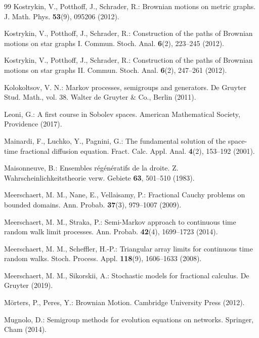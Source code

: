 \documentclass[11pt,a4paper]{article}
\theoremstyle{plain}
\theoremstyle{definition}
\theoremstyle{remark}
\begin{document}
\begin{thebibliography}{99}
			Kostrykin, V., Potthoff, J., Schrader, R.:
			Brownian motions on metric graphs. J. Math. Phys. \textbf{53}(9), 095206 (2012).
			
			Kostrykin, V., Potthoff, J., Schrader, R.:
			Construction of the paths of Brownian motions on star graphs I. Commun. Stoch. Anal. \textbf{6}(2), 223--245 (2012).
			
			Kostrykin, V., Potthoff, J., Schrader, R.:
			Construction of the paths of Brownian motions on star graphs II. Commun. Stoch. Anal. \textbf{6}(2), 247--261 (2012).
			
			Kolokoltsov, V. N.:
			Markov processes, semigroups and generators. De Gruyter Stud. Math., vol. 38. Walter de Gruyter \& Co., Berlin (2011).
			
			Leoni, G.:
			A first course in Sobolev spaces. American Mathematical Society, Providence (2017).
			
			Mainardi, F., Luchko, Y., Pagnini, G.:
			The fundamental solution of the space-time fractional diffusion equation. Fract. Calc. Appl. Anal. \textbf{4}(2), 153--192 (2001).
			
			Maisonneuve, B.:
			Ensembles r\'eg\'en\'eratifs de la droite. Z. Wahrscheinlichkeitstheorie verw. Gebiete \textbf{63}, 501--510 (1983).
			
			Meerschaert, M. M., Nane, E., Vellaisamy, P.:
			Fractional Cauchy problems on bounded domains. Ann. Probab. \textbf{37}(3), 979--1007 (2009).
			
			Meerschaert, M. M., Straka, P.:
			Semi-Markov approach to continuous time random walk limit processes. Ann. Probab. \textbf{42}(4), 1699--1723 (2014).
			
			Meerschaert, M. M., Scheffler, H.-P.:
			Triangular array limits for continuous time random walks. Stoch. Process. Appl. \textbf{118}(9), 1606--1633 (2008).
			
			Meerschaert, M. M., Sikorskii, A.:
			Stochastic models for fractional calculus. De Gruyter (2019).
			
			M\"orters, P., Peres, Y.:
			Brownian Motion. Cambridge University Press (2012).
			
			Mugnolo, D.:
			Semigroup methods for evolution equations on networks. Springer, Cham (2014).
			

\end{thebibliography}
\end{document}

